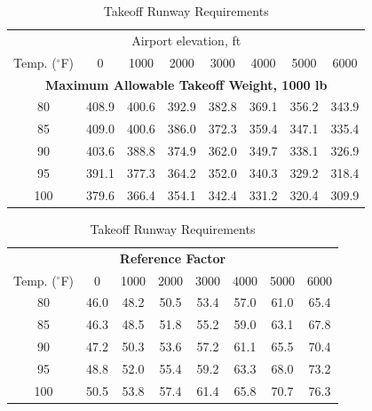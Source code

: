 \documentclass{KPS_assignment}
\begin{document}
\begin{table}[h!]
\centering
\caption{Takeoff Runway Requirements}
\small

\begin{tabular}{c|ccccccc}
\hline
\multicolumn{8}{c}{Airport elevation, ft} \\
Temp. ($^\circ$F) & 0 & 1000 & 2000 & 3000 & 4000 & 5000 & 6000 \\
\hline
\multicolumn{8}{c}{\textbf{Maximum Allowable Takeoff Weight, 1000 lb}} \\
80  & 408.9 & 400.6 & 392.9 & 382.8 & 369.1 & 356.2 & 343.9 \\
85  & 409.0 & 400.6 & 386.0 & 372.3 & 359.4 & 347.1 & 335.4 \\
90  & 403.6 & 388.8 & 374.9 & 362.0 & 349.7 & 338.1 & 326.9 \\
95  & 391.1 & 377.3 & 364.2 & 352.0 & 340.3 & 329.2 & 318.4 \\
100 & 379.6 & 366.4 & 354.1 & 342.4 & 331.2 & 320.4 & 309.9 \\
\hline
\end{tabular}

\vspace{0.5cm}

\begin{tabular}{c|ccccccc}
\hline
\multicolumn{8}{c}{\textbf{Reference Factor}} \\
Temp. ($^\circ$F) & 0 & 1000 & 2000 & 3000 & 4000 & 5000 & 6000 \\
\hline
80  & 46.0 & 48.2 & 50.5 & 53.4 & 57.0 & 61.0 & 65.4 \\
85  & 46.3 & 48.5 & 51.8 & 55.2 & 59.0 & 63.1 & 67.8 \\
90  & 47.2 & 50.3 & 53.6 & 57.2 & 61.1 & 65.5 & 70.4 \\
95  & 48.8 & 52.0 & 55.4 & 59.2 & 63.3 & 68.0 & 73.2 \\
100 & 50.5 & 53.8 & 57.4 & 61.4 & 65.8 & 70.7 & 76.3 \\
\hline
\end{tabular}

\vspace{0.5cm}


\end{table}
\end{document}
